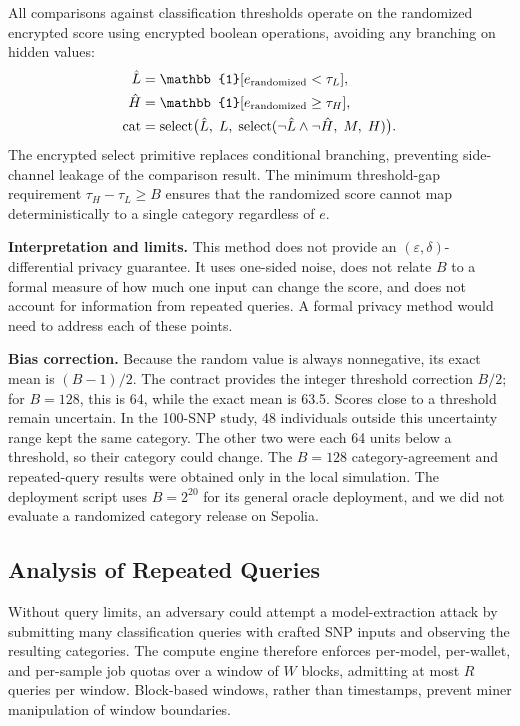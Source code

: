 \documentclass[10pt]{article}
\begin{document}
All comparisons against classification thresholds operate on the randomized encrypted
score using encrypted boolean operations, avoiding any branching on hidden values:
\begin{align}
\hat{L} &= \mathbb{1}[e_{\mathrm{randomized}} < \tau_L], \notag\\
\hat{H} &= \mathbb{1}[e_{\mathrm{randomized}} \geq \tau_H], \notag\\
\mathrm{cat} &= \mathrm{select}\bigl(\hat{L},\;L,\;\mathrm{select}(\neg\hat{L}\wedge\neg\hat{H},\;M,\;H)\bigr).
\label{eq:classify}
\end{align}
The encrypted select primitive replaces conditional branching, preventing side-channel
leakage of the comparison result.  The minimum threshold-gap requirement
$\tau_H - \tau_L \geq B$ ensures that the randomized score cannot map deterministically
to a single category regardless of $e$.

\textbf{Interpretation and limits.}
This method does not provide an $(\varepsilon,\delta)$-differential privacy guarantee.
It uses one-sided noise, does not relate $B$ to a formal measure of how much one input
can change the score, and does not account for information from repeated queries.  A
formal privacy method would need to address each of these points.

\textbf{Bias correction.}
Because the random value is always nonnegative, its exact mean is $(B-1)/2$.  The
contract provides the integer threshold correction $B/2$; for $B=128$, this is 64,
while the exact mean is 63.5.  Scores close to a threshold remain uncertain.  In the
100-SNP study, 48 individuals outside this uncertainty range kept the same category.
The other two were each 64 units below a threshold, so their category could change.
The $B=128$ category-agreement and repeated-query results were obtained only in the local
simulation.  The deployment script uses $B=2^{20}$ for its general oracle deployment, and
we did not evaluate a randomized category release on Sepolia.

\subsection{Analysis of Repeated Queries}

Without query limits, an adversary could attempt a model-extraction attack by
submitting many classification queries with crafted SNP inputs and observing the
resulting categories.  The compute engine therefore enforces per-model, per-wallet, and
per-sample job quotas over a window of $W$ blocks, admitting at most $R$ queries per
window.  Block-based windows, rather than timestamps, prevent miner manipulation of
window boundaries.
\end{document}
